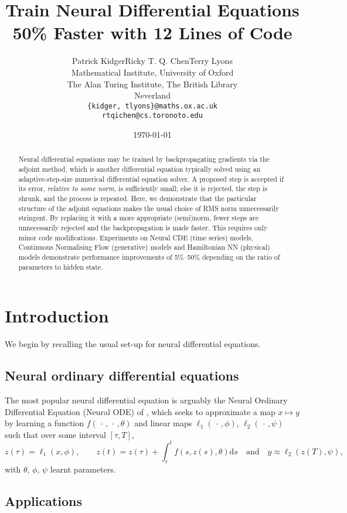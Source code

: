 \documentclass{article}
\title{Train Neural Differential Equations 50\% Faster with 12 Lines of Code}
\author{Patrick Kidger\footnotemark[1]\qquad Ricky T. Q. Chen\footnotemark[2]\qquad Terry Lyons\footnotemark[1]\\
\footnotemark[1]\hspace{0.5em}Mathematical Institute, University of Oxford\\
\footnotemark[1]\hspace{0.5em}The Alan Turing Institute, The British Library\\
\footnotemark[2]\hspace{0.5em}Neverland\\
\texttt{\{kidger, tlyons\}@\hspace{0.8pt}maths.ox.ac.uk}\\
\texttt{rtqichen@\hspace{0.8pt}cs.toronoto.edu}}
\date{\today}
\theoremstyle{plain}
\theoremstyle{definition}
\begin{document}
\maketitle

\begin{abstract}
Neural differential equations may be trained by backpropagating gradients via the adjoint method, which is another differential equation typically solved using an adaptive-step-size numerical differential equation solver. A proposed step is accepted if its error, \emph{relative to some norm}, is sufficiently small; else it is rejected, the step is shrunk, and the process is repeated. Here, we demonstrate that the particular structure of the adjoint equations makes the usual choice of RMS norm unnecessarily stringent. By replacing it with a more appropriate (semi)norm, fewer steps are unnecessarily rejected and the backpropagation is made faster. This requires only minor code modifications. Experiments on Neural CDE (time series) models, Continuous Normalising Flow (generative) models and Hamiltonian NN (physical) models demonstrate performance improvements of 5\%--50\% depending on the ratio of parameters to hidden state.
\end{abstract}

\section{Introduction}
We begin by recalling the usual set-up for neural differential equations.

\subsection{Neural ordinary differential equations}
The most popular neural differential equation is arguably the Neural Ordinary Differential Equation (Neural ODE) of \citet{E2017, neural-odes}, which seeks to approximate a map $x \mapsto y$ by learning a function $f(\,\cdot\,,\,\cdot\,, \theta)$ and linear maps $\ell_1(\,\cdot\,,\phi)$, $\ell_2(\,\cdot\,,\psi)$ such that over some interval $[\tau, T]$,
\begin{equation}\label{eq:node}
z(\tau) = \ell_1(x, \phi),\qquad z(t) = z(\tau) + \int_\tau^t f(s, z(s), \theta) \mathrm{d} s\quad\text{and}\quad y \approx \ell_2(z(T), \psi),
\end{equation}
with $\theta$, $\phi$, $\psi$ learnt parameters.

\subsection{Applications}
\end{document}
